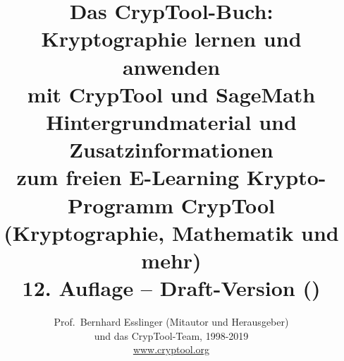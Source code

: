 \setlength{\fboxrule}{.5mm}
\setlength{\fboxsep}{1.75mm}
\setlength{\footnotesep}{6pt}
\addtolength{\footskip}{8pt}

\title{%
	{\Huge Das CrypTool-Buch:\\[20pt]
	       {\bf Kryptographie lernen und anwenden\\[15pt]
                mit CrypTool und SageMath}} \\[35pt]
	{\LARGE Hintergrundmaterial und Zusatzinformationen\\
	 zum freien E-Learning Krypto-Programm CrypTool\\[5pt]
	 (Kryptographie, Mathematik und mehr)} \\[35pt]
	 {\large 12. Auflage --  {\bf Draft-Version} (\currenttime)}
}%

\author{%
	{\LARGE Prof.\ Bernhard Esslinger (Mitautor und Herausgeber)}\\[10pt]
	{\LARGE und das CrypTool-Team, 1998-2019}\\[10pt]
	\url{www.cryptool.org}
}%

\usepackage{xurl}
\setcounter{biburllcpenalty}{1} \setcounter{biburlucpenalty}{1} \setcounter{biburlnumpenalty}{1}
\usepackage[colorlinks=true,linkcolor=blue,citecolor=blue,urlcolor=cyan, %
bookmarksnumbered=true,pdfpagelabels,plainpages=false,%
hyperfootnotes=false,
pdfencoding=auto]{hyperref}




%


